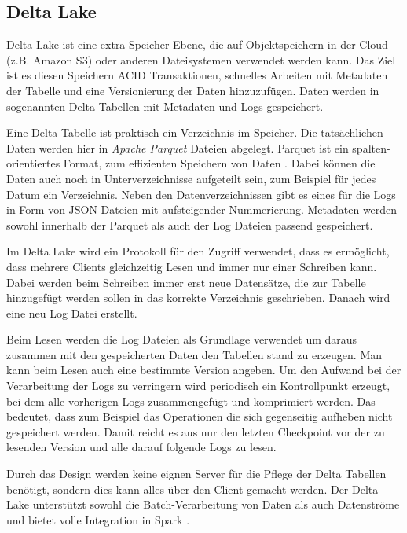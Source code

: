 \subsection{Delta Lake}

Delta Lake ist eine extra Speicher-Ebene, die auf Objektspeichern in der Cloud (z.B. Amazon S3) oder anderen Dateisystemen verwendet werden kann.
Das Ziel ist es diesen Speichern ACID Transaktionen, schnelles Arbeiten mit Metadaten der Tabelle und eine Versionierung der Daten hinzuzufügen.
Daten werden in sogenannten Delta Tabellen mit Metadaten und Logs gespeichert.

Eine Delta Tabelle ist praktisch ein Verzeichnis im Speicher.
Die tatsächlichen Daten werden hier in \textit{Apache Parquet} Dateien abgelegt.
Parquet ist ein spalten-orientiertes Format, zum effizienten Speichern von Daten \parencite{parquet}.
Dabei können die Daten auch noch in Unterverzeichnisse aufgeteilt sein, zum Beispiel für jedes Datum ein Verzeichnis.
Neben den Datenverzeichnissen gibt es eines für die Logs in Form von JSON Dateien mit aufsteigender Nummerierung.
Metadaten werden sowohl innerhalb der Parquet als auch der Log Dateien passend gespeichert.

Im Delta Lake wird ein Protokoll für den Zugriff verwendet, dass es ermöglicht, dass mehrere Clients gleichzeitig Lesen und immer nur einer Schreiben kann.
Dabei werden beim Schreiben immer erst neue Datensätze, die zur Tabelle hinzugefügt werden sollen in das korrekte Verzeichnis geschrieben.
Danach wird eine neu Log Datei erstellt.

Beim Lesen werden die Log Dateien als Grundlage verwendet um daraus zusammen mit den gespeicherten Daten den Tabellen stand zu erzeugen.
Man kann beim Lesen auch eine bestimmte Version angeben.
Um den Aufwand bei der Verarbeitung der Logs zu verringern wird periodisch ein Kontrollpunkt erzeugt, bei dem alle vorherigen Logs zusammengefügt und komprimiert werden.
Das bedeutet, dass zum Beispiel das Operationen die sich gegenseitig aufheben nicht gespeichert werden.
Damit reicht es aus nur den letzten Checkpoint vor der zu lesenden Version und alle darauf folgende Logs zu lesen.

Durch das Design werden keine eignen Server für die Pflege der Delta Tabellen benötigt, sondern dies kann alles über den Client gemacht werden.
Der Delta Lake unterstützt sowohl die Batch-Verarbeitung von Daten als auch Datenströme und bietet volle Integration in Spark \parencite{deltalake}.


